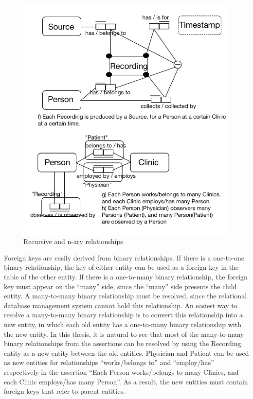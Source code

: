 \begin{figure}[ht]
    \centering
    \includegraphics[width=1.0\textwidth]{Figures/NaryAndRecursive.png}
    \caption{Recursive and n-ary relationships}
    \label{fig:Figures/NaryAndRecursive}
\end{figure}
Foreign keys are easily derived from binary relationships. If there is a one-to-one binary relationship, the key of either entity can be used as a foreign key in the table of the other entity. If there is a one-to-many binary relationship, the foreign key must appear on the “many” side, since the “many” side presents the child entity. A many-to-many binary relationship must be resolved, since the relational database management system cannot hold this relationship. An easiest way to resolve a many-to-many binary relationship is to convert this relationship into a new entity, in which each old entity has a one-to-many binary relationship with the new entity. In this thesis, it is natural to see that most of the many-to-many binary relationships from the assertions can be resolved by using the Recording entity as a new entity between the old entities. Physician and Patient can be used as new entities for relationships “works/belongs to” and “employ/has” respectively in the assertion “Each Person works/belongs to many Clinics, and each Clinic employs/has many Person”. As a result, the new entities must contain foreign keys that refer to parent entities.\\
